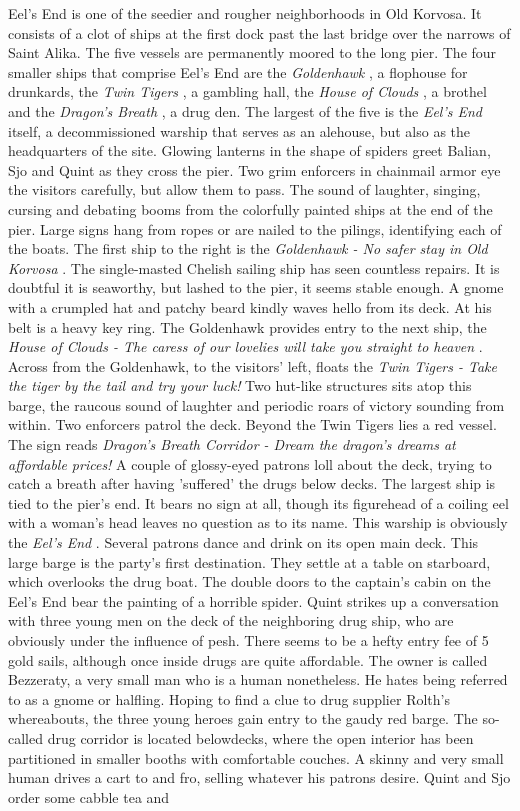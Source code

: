 Eel's End is one of the seedier and rougher neighborhoods in Old Korvosa. It consists of a clot of ships at the first dock past the last bridge over the narrows of Saint Alika. The five vessels are permanently moored to the long pier. The four smaller ships that comprise Eel's End are the {\itshape Goldenhawk} , a flophouse for drunkards, the  {\itshape Twin Tigers} , a gambling hall, the  {\itshape House of Clouds} , a brothel and the  {\itshape Dragon's Breath} , a drug den. The largest of the five is the  {\itshape Eel's End} itself, a decommissioned warship that serves as an alehouse, but also as the headquarters of the site. Glowing lanterns in the shape of spiders greet Balian, Sjo and Quint as they cross the pier. Two grim enforcers in chainmail armor eye the visitors carefully, but allow them to pass. The sound of laughter, singing, cursing and debating booms from the colorfully painted ships at the end of the pier. Large signs hang from ropes or are nailed to the pilings, identifying each of the boats. The first ship to the right is the {\itshape Goldenhawk - No safer stay in Old Korvosa} . The single-masted Chelish sailing ship has seen countless repairs. It is doubtful it is seaworthy, but lashed to the pier, it seems stable enough. A gnome with a crumpled hat and patchy beard kindly waves hello from its deck. At his belt is a heavy key ring. The Goldenhawk provides entry to the next ship, the {\itshape House of Clouds - The caress of our lovelies will take you straight to heaven} . Across from the Goldenhawk, to the visitors' left, floats the  {\itshape Twin Tigers - Take the tiger by the tail and try your luck!} Two hut-like structures sits atop this barge, the raucous sound of laughter and periodic roars of victory sounding from within. Two enforcers patrol the deck. Beyond the Twin Tigers lies a red vessel. The sign reads  {\itshape Dragon's Breath Corridor - Dream the dragon's dreams at affordable prices!} A couple of glossy-eyed patrons loll about the deck, trying to catch a breath after having 'suffered' the drugs below decks. The largest ship is tied to the pier's end. It bears no sign at all, though its figurehead of a coiling eel with a woman's head leaves no question as to its name. This warship is obviously the {\itshape Eel's End} . Several patrons dance and drink on its open main deck. This large barge is the party's first destination. They settle at a table on starboard, which overlooks the drug boat. The double doors to the captain's cabin on the Eel's End bear the painting of a horrible spider. Quint strikes up a conversation with three young men on the deck of the neighboring drug ship, who are obviously under the influence of pesh. There seems to be a hefty entry fee of 5 gold sails, although once inside drugs are quite affordable. The owner is called Bezzeraty, a very small man who is a human nonetheless. He hates being referred to as a gnome or halfling. Hoping to find a clue to drug supplier Rolth's whereabouts, the three young heroes gain entry to the gaudy red barge. The so-called drug corridor is located belowdecks, where the open interior has been partitioned in smaller booths with comfortable couches. A skinny and very small human drives a cart to and fro, selling whatever his patrons desire. Quint and Sjo order some cabble tea and 